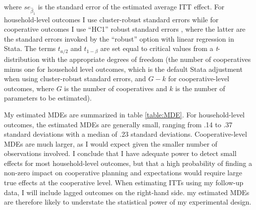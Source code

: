 \documentclass[11pt]{article}
\begin{document}
where $se_{\hat{\beta}_1}$ is the standard error of the estimated average ITT effect. For household-level outcomes I use cluster-robust standard errors while for cooperative outcomes I use ``HC1'' robust standard errors \citep{mackinnon-white.85}, where the latter are the standard errors invoked by the ``robust'' option with linear regression in Stata. The terms \textit{$t_{a/2}$} and \textit{$t_{1-\beta}$} are set equal to critical values from a \textit{t}-distribution with the appropriate degrees of freedom (the number of cooperatives minus one for household level outcomes, which is the default Stata adjustment when using cluster-robust standard errors, and $G - k$ for cooperative-level outcomes, where $G$ is the number of cooperatives and $k$ is the number of parameters to be estimated).

My estimated MDEs are summarized in table \ref{table:MDE}. For household-level outcomes, the estimated MDEs are generally small, ranging from .14 to .37 standard deviations with a median of .23 standard deviations. Cooperative-level MDEs are much larger, as I would expect given the smaller number of observations involved. I conclude that I have adequate power to detect small effects for most household-level outcomes, but that a high probability of finding a non-zero impact on cooperative planning and expectations would require large true effects at the cooperative level. When estimating ITTs using my follow-up data, I will include lagged outcomes on the right-hand side. my estimated MDEs are therefore likely to understate the statistical power of my experimental design.
\end{document}
